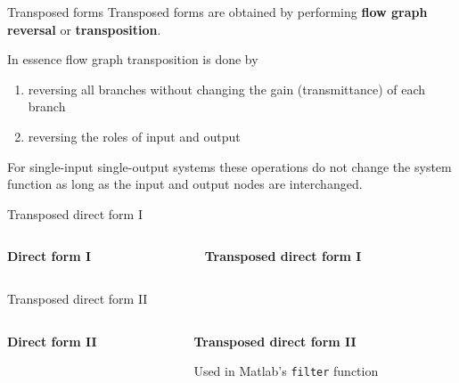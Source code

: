 \documentclass[10pt, handout]{beamer}
\begin{document}
\begin{frame}{Transposed forms}
	Transposed forms are obtained by performing \textbf{flow graph reversal} or \textbf{transposition}.

	In essence flow graph transposition is done by 
	\begin{enumerate}
		\item reversing all branches without changing the gain (transmittance) of each branch
		\item reversing the roles of input and output
	\end{enumerate}

	 For single-input single-output systems these operations do not change the system function as long as the input and output nodes are interchanged. 
\end{frame}

\begin{frame}{Transposed direct form I}
	\begin{columns}
		\begin{column}{0.5\textwidth}
			\textbf{Direct form I}
			\begin{center}
				\resizebox{\textwidth}{!}{}
			\end{center}
		\end{column}
		\begin{column}{0.5\textwidth}
			\textbf{Transposed direct form I}
			\begin{center}
				\resizebox{\textwidth}{!}{}
			\end{center}
		\end{column}
	\end{columns}
\end{frame}


\begin{frame}{Transposed direct form II}
	\begin{columns}[t]
		\begin{column}{0.5\textwidth}
			\textbf{Direct form II}
			\begin{center}
				\resizebox{\textwidth}{!}{}
			\end{center}
		\end{column}
		\begin{column}{0.5\textwidth}
			\textbf{Transposed direct form II}
			\begin{center}
				\resizebox{\textwidth}{!}{}
			\end{center}
			\pause
			Used in Matlab's \texttt{filter} function
		\end{column}
	\end{columns}
\end{frame}
\end{document}
